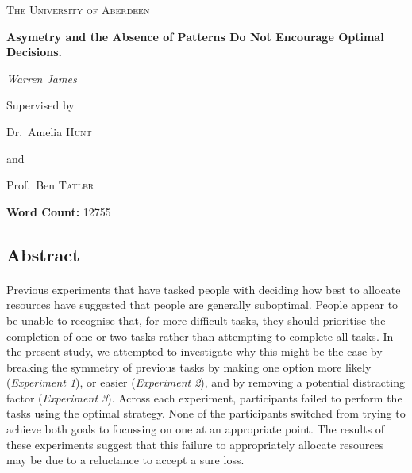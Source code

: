 \documentclass[12pt]{article}
\begin{document}
\begin{titlepage}
	\centering
	{\scshape\Large The University of Aberdeen \par}
	\vspace{1cm}
	{\huge\bfseries Asymetry and the Absence of Patterns Do Not Encourage Optimal Decisions.\par}
	\vspace{1cm}
	{\Large\itshape Warren James\par}
	\vfill
	Supervised by\par
	Dr.~Amelia \textsc{Hunt}\par
	and\par
	Prof.~Ben \textsc{Tatler}\par
	\textbf{Word Count:} 12755
	\vfill
\end{titlepage}	


\newpage
\begin{center}
\section*{Abstract}
\paragraph{} Previous experiments that have tasked people with deciding how best to allocate resources have suggested that people are generally suboptimal. People appear to be unable to recognise that, for more difficult tasks, they should prioritise the completion of one or two tasks rather than attempting to complete all tasks. In the present study, we attempted to investigate why this might be the case by breaking the symmetry of previous tasks by making one option more likely (\textit{Experiment 1}), or easier (\textit{Experiment 2}), and by removing a potential distracting factor (\textit{Experiment 3}). Across each experiment, participants failed to perform the tasks using the optimal strategy. None of the participants switched from trying to achieve both goals to focussing on one at an appropriate point. The results of these experiments suggest that this failure to appropriately allocate resources may be due to a reluctance to accept a sure loss. 
\end{center}
\end{document}
